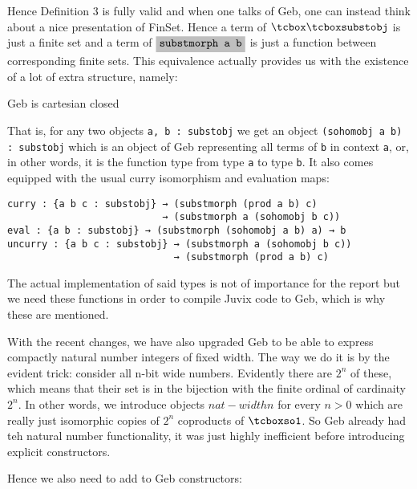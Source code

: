 Hence Definition 3 is fully valid and when one talks of Geb, one can instead think about a nice presentation of FinSet. Hence a term of $\gebobj$ is just a finite set and a term of $\colorbox{gray!50}{\texttt{substmorph a b}}$ is just a function between corresponding finite sets. This equivalence actually provides us with the existence of a lot of extra structure, namely:

\begin{corollary}
Geb is cartesian closed
\end{corollary}

That is, for any two objects \colorbox{gray!50}{\texttt{a, b : substobj}} we get an object \colorbox{gray!50}{\texttt{(sohomobj a b) : substobj}} which is an object of Geb representing all terms of \colorbox{gray!50}{\texttt{b}} in context \colorbox{gray!50}{\texttt{a}}, or, in other words, it is the function type from type \colorbox{gray!50}{\texttt{a}} to type \colorbox{gray!50}{\texttt{b}}. It also comes equipped with the usual curry isomorphism and evaluation maps:

\begin{verbatim}
curry : {a b c : substobj} → (substmorph (prod a b) c) 
                           → (substmorph a (sohomobj b c))
eval : {a b : substobj} → (substmorph (sohomobj a b) a) → b
uncurry : {a b c : substobj} → (substmorph a (sohomobj b c)) 
                             → (substmorph (prod a b) c)
\end{verbatim}

The actual implementation of said types is not of importance for the report but we need these functions in order to compile Juvix code to Geb, which is why these are mentioned. 

With the recent changes, we have also upgraded Geb to be able to express compactly natural number integers of fixed width. The way we do it is by the evident trick: consider all n-bit wide numbers. Evidently there are $2^n$ of these, which means that their set is in the bijection with the finite ordinal of cardinaity $2^n$. In other words, we introduce objects $nat-width n$ for every $n > 0$ which are really just isomorphic copies of $2^n$ coproducts of $\gebterm$. So Geb already had teh natural number functionality, it was just highly inefficient before introducing explicit constructors.

Hence we also need to add to Geb constructors:

